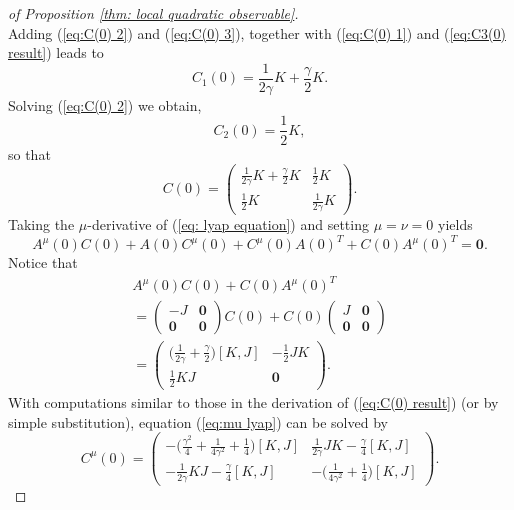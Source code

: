 \begin{proof}[of Proposition \ref{thm: local quadratic observable}]
\begin{equation}
	\end{equation}
	Adding (\ref{eq:C(0) 2}) and (\ref{eq:C(0) 3}), together with (\ref{eq:C(0) 1})
	and (\ref{eq:C3(0) result}) leads to 
	\[
	C_{1}(0)=\frac{1}{2\gamma}K+\frac{\gamma}{2}K.
	\]
	Solving (\ref{eq:C(0) 2}) we obtain, 
	\[
	C_{2}(0)=\frac{1}{2}K,
	\]
	so that
	\begin{equation}
	C(0)=\left(\begin{array}{cc}
	\frac{1}{2\gamma}K+\frac{\gamma}{2}K & \frac{1}{2}K\\
	\frac{1}{2}K & \frac{1}{2\gamma}K
	\end{array}\right).\label{eq:C(0) result}
	\end{equation}
	Taking the $\mu$-derivative of (\ref{eq: lyap equation}) and setting
	$\mu=\nu=0$ yields 
	\begin{equation}
	A^{\mu}(0)C(0)+A(0)C^{\mu}(0)+C^{\mu}(0)A(0)^{T}+C(0)A^{\mu}(0)^{T}=\boldsymbol{0}.\label{eq:mu lyap}
	\end{equation}
	Notice that 
	\begin{align*}
	A^{\mu}(0)C(0)+C(0)A^{\mu}(0)^{T}\\
	=\left(\begin{array}{cc}
	-J & \boldsymbol{0}\\
	\boldsymbol{0} & \boldsymbol{0}
	\end{array}\right)C(0)+C(0)\left(\begin{array}{cc}
	J & \boldsymbol{0}\\
	\boldsymbol{0} & \boldsymbol{0}
	\end{array}\right)\\
	=\left(\begin{array}{cc}
	\big(\frac{1}{2\gamma}+\frac{\gamma}{2}\big)[K,J] & -\frac{1}{2}JK\\
	\frac{1}{2}KJ & \boldsymbol{0}
	\end{array}\right).
	\end{align*}
	With computations similar to those in the derivation of (\ref{eq:C(0) result})
	(or by simple substitution), equation (\ref{eq:mu lyap}) can be solved
	by 
	\begin{equation}
	C^{\mu}(0)=\left(\begin{array}{cc}
	-\big(\frac{\gamma^{2}}{4}+\frac{1}{4\gamma^{2}}+\frac{1}{4}\big)[K,J] & \frac{1}{2\gamma}JK-\frac{\gamma}{4}[K,J]\\
	-\frac{1}{2\gamma}KJ-\frac{\gamma}{4}[K,J] & -\big(\frac{1}{4\gamma^{2}}+\frac{1}{4}\big)[K,J]
	\end{array}\right).\label{eq:C^mu}
	\end{equation}

\end{proof}

